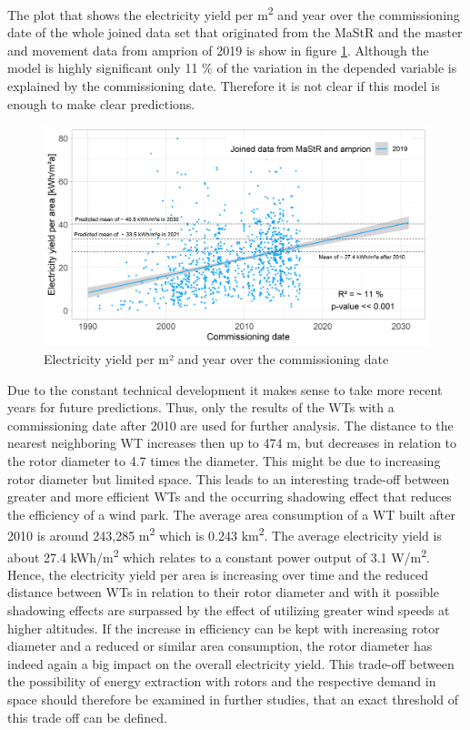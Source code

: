 \documentclass[a4paper,11pt]{article}
\begin{document}
The plot that shows the electricity yield per m\textsuperscript{2} and year over the commissioning date of the whole joined data set that originated from the MaStR and the master and movement data from amprion of 2019 is show in figure \ref{fig:eyarea}. Although the model is highly significant only 11 \% of the variation in the depended variable is explained by the commissioning date. Therefore it is not clear if this model is enough to make clear predictions.
\begin{figure}

{\centering \includegraphics[width=1\linewidth]{data/MaStR_amprion_analysis/results_of_analysis/e_yield_per_m2_over_commissioning_date} 

}

\caption{Electricity yield per m² and year over the commissioning date}\label{fig:eyarea}
\end{figure}
Due to the constant technical development it makes sense to take more recent years for future predictions. Thus, only the results of the WTs with a commissioning date after 2010 are used for further analysis. The distance to the nearest neighboring WT increases then up to 474 m, but decreases in relation to the rotor diameter to 4.7 times the diameter. This might be due to increasing rotor diameter but limited space. This leads to an interesting trade-off between greater and more efficient WTs and the occurring shadowing effect that reduces the efficiency of a wind park. The average area consumption of a WT built after 2010 is around 243,285 m\textsuperscript{2} which is 0.243 km\textsuperscript{2}. The average electricity yield is about 27.4 kWh/m\textsuperscript{2} which relates to a constant power output of 3.1 W/m\textsuperscript{2}. Hence, the electricity yield per area is increasing over time and the reduced distance between WTs in relation to their rotor diameter and with it possible shadowing effects are surpassed by the effect of utilizing greater wind speeds at higher altitudes. If the increase in efficiency can be kept with increasing rotor diameter and a reduced or similar area consumption, the rotor diameter has indeed again a big impact on the overall electricity yield. This trade-off between the possibility of energy extraction with rotors and the respective demand in space should therefore be examined in further studies, that an exact threshold of this trade off can be defined.
\end{document}
